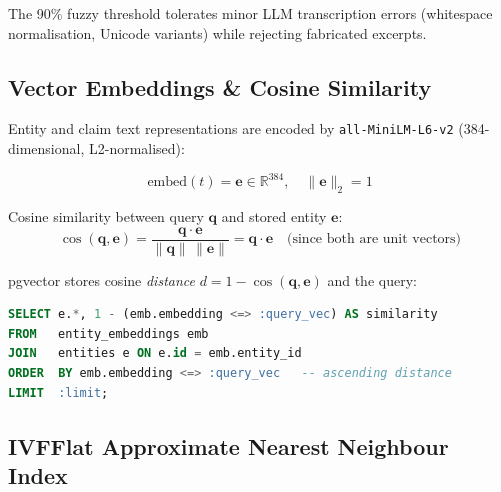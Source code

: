 \documentclass[11pt,a4paper]{article}
\newcommand{\code}[1]{\texttt{\small#1}}
\begin{document}
The 90\% fuzzy threshold tolerates minor LLM transcription errors (whitespace
normalisation, Unicode variants) while rejecting fabricated excerpts.

\subsection{Vector Embeddings \& Cosine Similarity}

Entity and claim text representations are encoded by \code{all-MiniLM-L6-v2}
(384-dimensional, L2-normalised):

\begin{equation}
  \text{embed}(t) = \mathbf{e} \in \mathbb{R}^{384}, \quad \|\mathbf{e}\|_2 = 1
\end{equation}

Cosine similarity between query $\mathbf{q}$ and stored entity $\mathbf{e}$:
\begin{equation}
  \cos(\mathbf{q},\mathbf{e})
  = \frac{\mathbf{q}\cdot\mathbf{e}}{\|\mathbf{q}\|\,\|\mathbf{e}\|}
  = \mathbf{q}\cdot\mathbf{e}
  \quad\text{(since both are unit vectors)}
\end{equation}

pgvector stores cosine \emph{distance} $d = 1 - \cos(\mathbf{q},\mathbf{e})$ and the
query:

\begin{lstlisting}[language=SQL, caption={pgvector ANN query using cosine distance operator}]
SELECT e.*, 1 - (emb.embedding <=> :query_vec) AS similarity
FROM   entity_embeddings emb
JOIN   entities e ON e.id = emb.entity_id
ORDER  BY emb.embedding <=> :query_vec   -- ascending distance
LIMIT  :limit;
\end{lstlisting}

\subsection{IVFFlat Approximate Nearest Neighbour Index}
\end{document}
